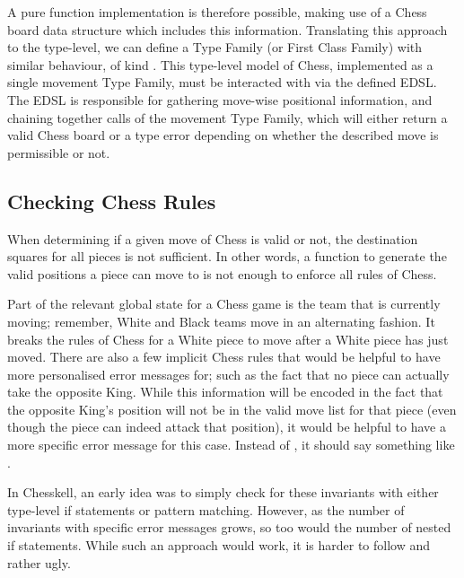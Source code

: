 A pure function implementation is therefore possible, making use of a Chess board data structure which includes this information. Translating this approach to the type-level, we can define a Type Family (or First Class Family) with similar behaviour, of kind . This type-level model of Chess, implemented as a single movement Type Family, must be interacted with via the defined EDSL. The EDSL is responsible for gathering move-wise positional information, and chaining together calls of the movement Type Family, which will either return a valid Chess board or a type error depending on whether the described move is permissible or not.

\subsection{Checking Chess Rules} \label{chessrules}

When determining if a given move of Chess is valid or not, the destination squares for all pieces is not sufficient. In other words, a function to generate the valid positions a piece can move to is not enough to enforce all rules of Chess.

Part of the relevant global state for a Chess game is the team that is currently moving; remember, White and Black teams move in an alternating fashion. It breaks the rules of Chess for a White piece to move after a White piece has just moved. There are also a few implicit Chess rules that would be helpful to have more personalised error messages for; such as the fact that no piece can actually take the opposite King. While this information will be encoded in the fact that the opposite King's position will not be in the valid move list for that piece (even though the piece can indeed attack that position), it would be helpful to have a more specific error message for this case. Instead of , it should say something like .

In Chesskell, an early idea was to simply check for these invariants with either type-level if statements or pattern matching. However, as the number of invariants with specific error messages grows, so too would the number of nested if statements. While such an approach would work, it is harder to follow and rather ugly.

